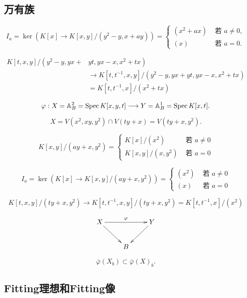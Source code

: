 \subsection{万有族}\label{s:4.1.2}


\[
    I_a=\ker\left(K[x] \rightarrow K[x, y] /\left(y^2-y, x+a y\right)\right)= 
    \begin{cases}
        (x^2+a x) & \text{ 若 } a \neq 0, \\
        (x) & \text{ 若 } a=0.
    \end{cases}
\]

\[
    \begin{aligned}
        K[t, x, y] /\left(y^2-y, y x+\right. & \left.y t, y x-x, x^2+t x\right) \\
        & \rightarrow K\left[t, t^{-1}, x, y\right] /\left(y^2-y, y x+y t, y x-x, x^2+t x\right) \\
        & =K\left[t, t^{-1}, x\right] /\left(x^2+t x\right)
    \end{aligned}
\]


\[
    \varphi: X=\mathbb{A}_B^2=\operatorname{Spec} K[x, y, t] \longrightarrow Y=\mathbb{A}_B^1=\operatorname{Spec} K[x, t].
\]

\[
    X=V\left(x^2, x y, y^2\right) \cap V(t y+x)=V\left(t y+x, y^2\right).
\]



\[
    K[x, y] /\left(a y+x, y^2\right)= 
    \begin{cases}K[x] /\left(x^2\right) & \text { 若 } a \neq 0 \\ 
        K[x, y] /\left(x, y^2\right) & \text { 若 } a=0\end{cases}
\]

\[
    I_a=\ker\left(K[x] \rightarrow K[x, y] /\left(a y+x, y^2\right)\right)= 
    \begin{cases}\left(x^2\right) & \text { 若 } a \neq 0 \\ 
        (x) & \text { 若 } a=0\end{cases}
\]

\[
    K[t, x, y] /\left(t y+x, y^2\right) \rightarrow K\left[t, t^{-1}, x, y\right] /
    \left(t y+x, y^2\right)=K\left[t, t^{-1}, x\right] /\left(x^2\right)
\]

\[
    \xymatrix{
        X\ar[rr]^\varphi\ar[rd]&&Y\ar[ld]\\
        &B&
    }
\]

\[
    \bar{\varphi}\left(X_b\right) \subset \bar{\varphi}(X)_b.
\]


\subsection{Fitting理想和Fitting像}\label{s:4.1.3}